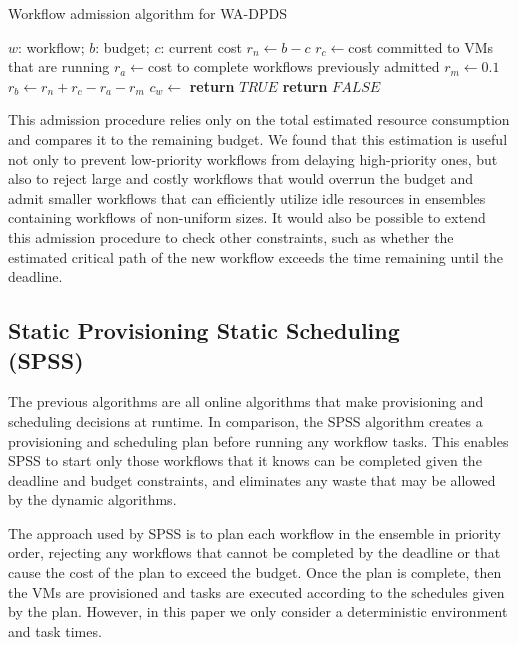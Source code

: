 \documentclass{sig-alternate}
\begin{document}
\begin{algorithm}
\caption{Workflow admission algorithm for WA-DPDS}
\label{alg:wa-dpds}
\begin{algorithmic}[1]
\Require $w$: workflow; $b$: budget; $c$: current cost
    \State $r_n\gets b-c$ 
    \State $r_c\gets $cost committed to VMs that are running
    \State $r_a\gets $cost to complete workflows previously admitted
	\State $r_m\gets 0.1$ 
	\State $r_b\gets r_n+r_c-r_a-r_m$ 
	\State $c_w\gets$ 
    	\State \textbf{return} $TRUE$
    \Else
    	\State \textbf{return} $FALSE$
	\EndIf    	 
\EndProcedure
\end{algorithmic} 
\end{algorithm}


This admission procedure relies only on the total estimated resource consumption and
compares it to the remaining budget. We found that this estimation is useful not
only to prevent low-priority workflows from delaying high-priority ones, but
also to reject large and costly workflows that would overrun the budget and
admit smaller workflows that can efficiently utilize idle resources in ensembles 
containing workflows of non-uniform sizes. It would also be possible to extend this 
admission procedure to check other constraints, such as whether the estimated 
critical path of the new workflow exceeds the time remaining until the deadline.



\subsection{Static Provisioning Static Scheduling \\(SPSS)}

The previous algorithms are all online algorithms that make provisioning 
and scheduling decisions at runtime. In comparison, the SPSS algorithm 
creates a provisioning and scheduling plan before running any workflow tasks.
This enables SPSS to start only those workflows that it knows can be completed
given the deadline and budget constraints, and eliminates any waste that may
be allowed by the dynamic algorithms.

The approach used by SPSS is to plan each workflow in the ensemble in priority 
order, rejecting any workflows that cannot be completed by the deadline or that 
cause the cost of the plan to exceed the budget. Once the plan is complete, then 
the VMs are provisioned and tasks are executed according to the schedules given
by the plan. However, in this paper we only consider a deterministic environment and task times.
\end{document}
